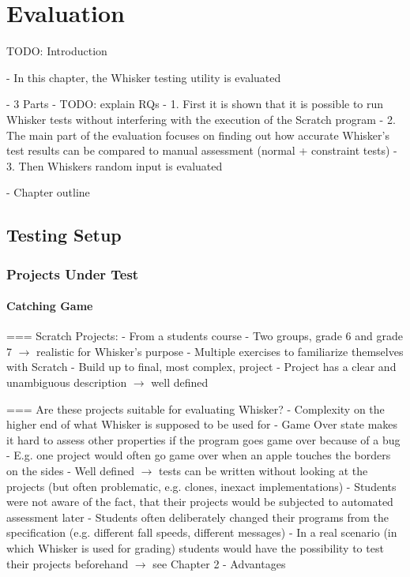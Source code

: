 
\chapter{Evaluation}%
\label{cha:evaluation}

TODO: Introduction

- In this chapter, the Whisker testing utility is evaluated

- 3 Parts
- TODO: explain RQs
    - 1. First it is shown that it is possible to run Whisker tests without interfering with the execution of the Scratch program
    - 2. The main part of the evaluation focuses on finding out how accurate Whisker's test results can be compared to manual assessment (normal + constraint tests)
    - 3. Then Whiskers random input is evaluated

- Chapter outline

\section{Testing Setup}

\subsection{Projects Under Test}

\subsubsection*{Catching Game}

=== Scratch Projects:
- From a students course
- Two groups, grade 6 and grade 7 $\rightarrow$ realistic for Whisker's purpose
- Multiple exercises to familiarize themselves with Scratch
- Build up to final, most complex, project
- Project has a clear and unambiguous description $\rightarrow$ well defined

=== Are these projects suitable for evaluating Whisker?
- Complexity on the higher end of what Whisker is supposed to be used for
- Game Over state makes it hard to assess other properties if the program goes game over because of a bug
    - E.g. one project would often go game over when an apple touches the borders on the sides
    - Well defined $\rightarrow$ tests can be written without looking at the projects (but often problematic, e.g. clones, inexact implementations)
- Students were not aware of the fact, that their projects would be subjected to automated assessment later
    - Students often deliberately changed their programs from the specification (e.g. different fall speeds, different messages)
    - In a real scenario (in which Whisker is used for grading) students would have the possibility to test their projects beforehand
    $\rightarrow$ see Chapter 2 - Advantages

